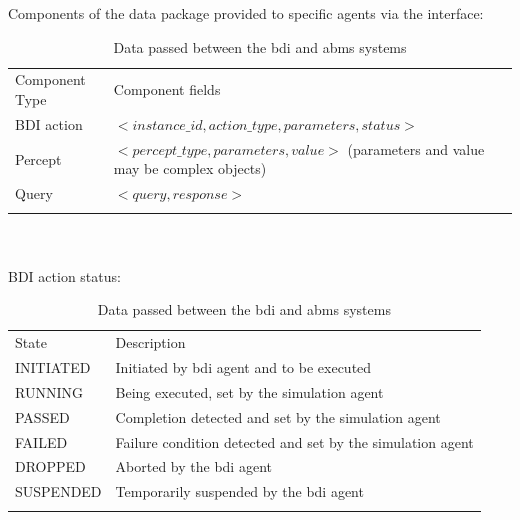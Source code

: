 \begin{table}[h]
Components of the data package provided to specific agents via the
interface:\\ 
\begin{tabular}{ @{}p{} | p{}@{}}
\hline\noalign{\smallskip}
{Component Type} & {Component fields}\\
\noalign{\smallskip}\hline\noalign{\smallskip}
{BDI action} & $<instance\_id, action\_type, parameters, status>$  \\
{Percept} & $<percept\_type, parameters, value>$
(parameters and value may be complex objects) \\
{Query} & $<query, response>$ \\
\noalign{\smallskip}\hline
\end{tabular}

~\\~\\BDI action status:\\
\begin{tabular}{ @{}p{} | p{}@{}}
\hline\noalign{\smallskip}
{State} & {Description}\\
\noalign{\smallskip}\hline\noalign{\smallskip}
INITIATED & Initiated by \gls{bdi} agent and to be executed\\
RUNNING & Being executed, set by the simulation agent\\
PASSED & Completion detected and set by the simulation agent \\
FAILED & Failure condition detected and set by the simulation agent \\
DROPPED & Aborted by the \gls{bdi} agent \\
SUSPENDED & Temporarily suspended by the \gls{bdi} agent  \\
\noalign{\smallskip}\hline
\end{tabular}
\caption{Data passed between the \gls{bdi} and \gls{abms} systems} 
\label{interfacedata}
\end{table}


